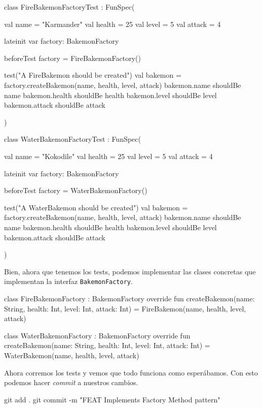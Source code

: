   \begin{kotlin}
    class FireBakemonFactoryTest : FunSpec({
      val name = "Karmander"
      val health = 25
      val level = 5
      val attack = 4
      
      lateinit var factory: BakemonFactory

      beforeTest {
        factory = FireBakemonFactory()
      }

      test("A FireBakemon should be created") {
        val bakemon = factory.createBakemon(name, health, level, attack)
        bakemon.name shouldBe name
        bakemon.health shouldBe health
        bakemon.level shouldBe level
        bakemon.attack shouldBe attack
      }
    })
  \end{kotlin}

  \begin{kotlin}
    class WaterBakemonFactoryTest : FunSpec({
      val name = "Kokodile"
      val health = 25
      val level = 5
      val attack = 4
      
      lateinit var factory: BakemonFactory

      beforeTest {
        factory = WaterBakemonFactory()
      }

      test("A WaterBakemon should be created") {
        val bakemon = factory.createBakemon(name, health, level, attack)
        bakemon.name shouldBe name
        bakemon.health shouldBe health
        bakemon.level shouldBe level
        bakemon.attack shouldBe attack
      }
    })
  \end{kotlin}

  Bien, ahora que tenemos los tests, podemos implementar las clases concretas que implementan la
  interfaz \texttt{BakemonFactory}.

  \begin{kotlin}
    class FireBakemonFactory : BakemonFactory {
      override fun createBakemon(name: String, health: Int, level: Int, attack: Int) =
        FireBakemon(name, health, level, attack)
    }
  \end{kotlin}

  \begin{kotlin}
    class WaterBakemonFactory : BakemonFactory {
      override fun createBakemon(name: String, health: Int, level: Int, attack: Int) =
        WaterBakemon(name, health, level, attack)
    }
  \end{kotlin}

  Ahora corremos los tests y vemos que todo funciona como esperábamos.
  Con esto podemos hacer \textit{commit} a nuestros cambios.

  \begin{powershell}
    git add .
    git commit -m "FEAT Implements Factory Method pattern"
  \end{powershell}
